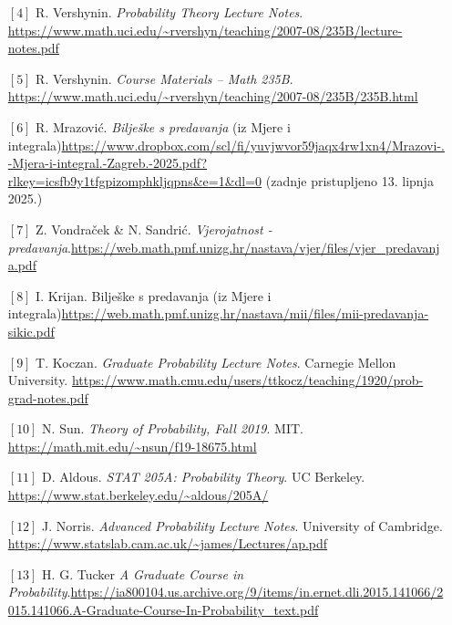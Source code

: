 \documentclass{article}
\begin{document}
\begin{enumerate}
    \item[\({[4]}\)] R. Vershynin.  
    \textit{Probability Theory Lecture Notes}.\newline  
    \url{https://www.math.uci.edu/~rvershyn/teaching/2007-08/235B/lecture-notes.pdf}
    \item[\({[5]}\)] R. Vershynin.  
    \textit{Course Materials – Math 235B}.  \newline
    \url{https://www.math.uci.edu/~rvershyn/teaching/2007-08/235B/235B.html}
    \item[\({[6]}\)] R. Mrazović. \emph{Bilješke s predavanja} (iz Mjere i integrala)\newline\url{https://www.dropbox.com/scl/fi/yuvjwvor59jaqx4rw1xn4/Mrazovi-.-Mjera-i-integral.-Zagreb.-2025.pdf?rlkey=icsfb9y1tfgpizomphkljqpns&e=1&dl=0} (zadnje pristupljeno 13. lipnja 2025.)
    \item[\({[7]}\)] Z. Vondraček \& N. Sandrić. \emph{Vjerojatnost - predavanja}.\newline \url{https://web.math.pmf.unizg.hr/nastava/vjer/files/vjer_predavanja.pdf}
    \item[\({[8]}\)] I. Krijan. Bilješke s predavanja (iz Mjere i integrala)\newline \url{https://web.math.pmf.unizg.hr/nastava/mii/files/mii-predavanja-sikic.pdf}
    \item[\({[9]}\)] T. Koczan.  
    \textit{Graduate Probability Lecture Notes}. Carnegie Mellon University. \newline \url{https://www.math.cmu.edu/users/ttkocz/teaching/1920/prob-grad-notes.pdf}
    \item[\({[10]}\)] N. Sun.  
    \textit{Theory of Probability, Fall 2019}. MIT. \newline  \url{https://math.mit.edu/~nsun/f19-18675.html}
    \item[\({[11]}\)] D. Aldous.  
    \textit{STAT 205A: Probability Theory}. UC Berkeley. \newline 
    \url{https://www.stat.berkeley.edu/~aldous/205A/}
    \item[\({[12]}\)] J. Norris.  
    \textit{Advanced Probability Lecture Notes}. University of Cambridge. \newline \url{https://www.statslab.cam.ac.uk/~james/Lectures/ap.pdf}
    \item[\({[13]}\)] H. G. Tucker  
    \textit{A Graduate Course in Probability}.\newline \url{https://ia800104.us.archive.org/9/items/in.ernet.dli.2015.141066/2015.141066.A-Graduate-Course-In-Probability_text.pdf}
\end{enumerate}
\end{document}
